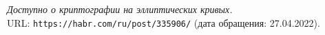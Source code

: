 \pagebreak
\begin{thebibliography}{99}
{\itshape Доступно о криптографии на эллиптических кривых.} \\URL: \texttt{https://habr.com/ru/post/335906/} (дата обращения: 27.04.2022).
\end{thebibliography}
\pagebreak
